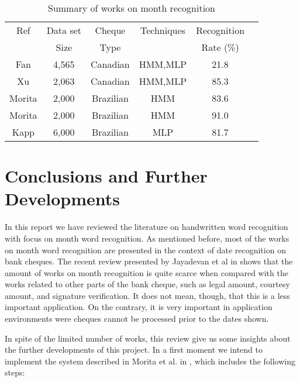 \documentclass{article}[14pt, oneside, a4paper, times]
\begin{document}
\begin{table} [ht!]
\caption {Summary of works on month recognition}
\begin{center}
\begin{tabular}{cccccc} \hline 
 \multicolumn{1}{c}{Ref}&
 \multicolumn{1}{c}{Data set}&
\multicolumn{1}{c}{Cheque }&
 \multicolumn{1}{c}{Techniques}&
 \multicolumn{1}{c}{Recognition} \\
 \multicolumn{1}{c}{}&
 \multicolumn{1}{c}{Size}&
\multicolumn{1}{c}{Type}&
 \multicolumn{1}{c}{}&
 \multicolumn{1}{c}{Rate (\%)} \\ \hline

Fan \cite{Fan96}      & 4,565  & Canadian  & HMM,MLP & 21.8 \\
Xu \cite{Xu2002}     & 2,063  & Canadian  & HMM,MLP & 85.3 \\
Morita \cite{Morita2000} & 2,000  & Brazilian & HMM     & 83.6 \\
Morita \cite{Morita2001} & 2,000  & Brazilian & HMM     & 91.0 \\
Kapp \cite{Kapp2007}   & 6,000  & Brazilian & MLP     & 81.7 \\ \hline
 
\end{tabular}
\label{summary-month:tab}
\end{center}
\end{table}


\section{Conclusions and Further Developments}

In this report we have reviewed the literature on handwritten word recognition with focus on month word recognition. As mentioned before, most of the works on month word recognition are presented in the context of date recognition on bank cheques. The recent review presented by Jayadevan et al in \cite{Jayadevan2012} shows that the amount of works on month recognition is quite scarce when compared with the works related to other parts of the bank cheque, such as legal amount, courtesy amount, and signature verification. It  does not mean, though, that this is a less important application. On the contrary, it is very important in application environments were cheques cannot be processed prior to the dates shown. 

In spite of the limited number of works, this review give us some insights about the further developments of this project. In a first moment we intend to implement the system described in Morita et al. in \cite{Morita2001,Morita2004}, which includes the following steps:
\end{document}
